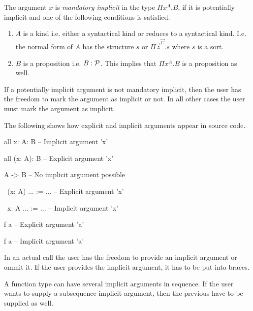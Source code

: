 The argument $x$ is \emph{mandatory implicit} in the type $\Pi x^A. B$, if it is
potentially implicit and one of the following conditions is satisfied.

\begin{enumerate}

\item
    $A$ is a kind i.e. either a syntactical kind or reduces to a syntactical
        kind. I.e. the normal form of $A$ has the structure $s$ or $\Pi
        \vec{z}^\vec{C}.  s$ where $s$ is a sort.


\item
    $B$ is a proposition i.e. $B: {\cal{P}}$. This implies that $\Pi x^A. B$ is a
        proposition as well.

\end{enumerate}


If a potentially implicit argument is not mandatory implicit, then the user has
the freedom to mark the argument as implicit or not. In all other cases the user
must mark the argument as implicit.

The following shows how explicit and implicit arguments appear in source code.


\begin{alba}
    all {x: A}: B               -- Implicit argument 'x'

    all (x: A): B               -- Explicit argument 'x'

    A -> B                      -- No implicit argument possible


    \ (x: A) ... := ...         -- Explicit argument 'x'

    \ {x: A} ... := ...         -- Implicit argument 'x'


    f a                         -- Explicit argument 'a'

    f {a}                       -- Implicit argument 'a'
\end{alba}
%
In an actual call the user has the freedom to provide an implicit argument or
ommit it. If the user provides the implicit argument, it has to be put into
braces.

A function type can have several implicit arguments in sequence. If the user
wants to supply a subsequence implicit argument, then the previous have to be
supplied as well.











